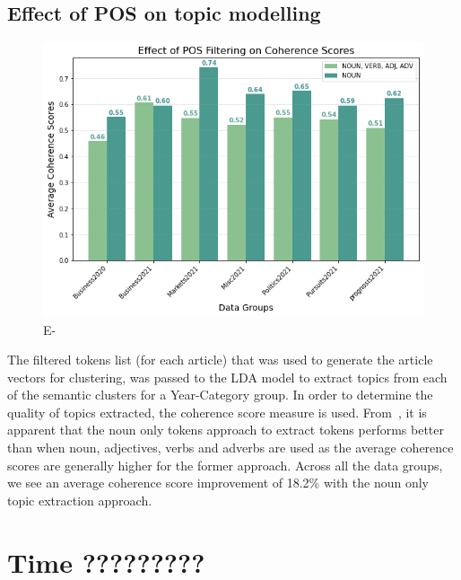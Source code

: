 \subsection{Effect of POS on topic modelling} \label{s:pos_topic}
\begin{figure}[H]
\centering
\includegraphics[width=0.7\linewidth]{images/eval/pos_coherence.png}
\caption{E-}
\label{fig:pos_topic}
\end{figure}
\vspace{-1em}
The filtered tokens list (for each article) that was used to generate the article vectors for clustering, was passed to the LDA model to extract topics from each of the semantic clusters for a Year-Category group. In order to determine the quality of topics extracted, the coherence score measure is used. From~, it is apparent that the noun only tokens approach to extract tokens performs better than when noun, adjectives, verbs and adverbs are used as the average coherence scores are generally higher for the former approach. Across all the data groups, we see an average coherence score improvement of 18.2\% with the noun only topic extraction approach.  




\section{Time ?????????}

